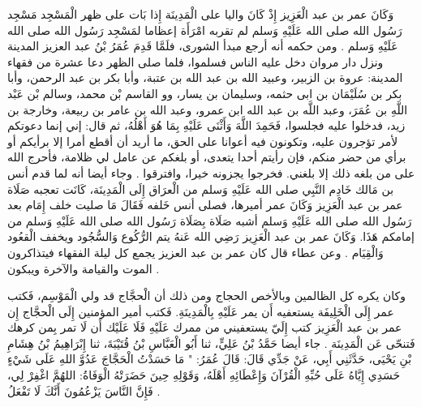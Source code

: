 وَكَانَ عمر بن عبد الْعَزِيز إِذْ كَانَ واليا على الْمَدِينَة إِذا بَات على ظهر الْمَسْجِد مَسْجِد رَسُول الله صلى الله عَلَيْهِ وَسلم لم تقربه امْرَأَة إعظاما لمَسْجِد رَسُول الله صلى الله عَلَيْهِ وَسلم \cite{ibnAbdAlHakam_OmarIbnAbdAlAziz}.
ومن حكمه أنه أرجع مبدأ الشورى، فلَمَّا قَدِمَ عُمَرُ بْنُ عبد العزيز المدينة ونزل دار مروان دخل عليه الناس فسلموا، فلما صلى الظهر دعا عشرة من فقهاء المدينة: عروة بن الزبير، وعبيد الله بن عبد الله بن عتبة، وأبا بكر بن عبد الرحمن، وأبا بكر بن سُلَيْمَان بن ابى حثمه، وسليمان بن يسار، وو القاسم بْن محمد، وسالم بْن عَبْد اللَّهِ بن عُمَرَ، وعبد اللَّه بن عبد الله ابن عمرو، وعبد الله بن عامر بن ربيعة، وخارجة بن زيد، فدخلوا عليه فجلسوا، فَحَمِدَ اللَّهَ وَأَثْنَى عَلَيْهِ بِمَا هُوَ أَهْلُهُ، ثم قال: إني إنما دعوتكم لأمر تؤجرون عليه، وتكونون فيه أعوانا على الحق، ما أريد أن أقطع أمرا إلا برأيكم أو برأي من حضر منكم، فإن رأيتم أحدا يتعدى، أو بلغكم عن عامل لي ظلامة، فأحرج الله على من بلغه ذلك إلا بلغني. فخرجوا يجزونه خيرا، وافترقوا \cite{ibnJareerTabari_Tareekh}. وجاء أيضا أنه لما قدم أنس بن مَالك خَادِم النَّبِي صلى الله عَلَيْهِ وَسلم من الْعرَاق إِلَى الْمَدِينَة، كَانَت تعجبه صَلَاة عمر بن عبد الْعَزِيز وَكَانَ عمر أميرها، فصلى أنس خَلفه فَقَالَ مَا صليت خلف إِمَام بعد رَسُول الله صلى الله عَلَيْهِ وَسلم أشبه صَلَاة بِصَلَاة رَسُول الله صلى الله عَلَيْهِ وَسلم من إمامكم هَذَا. وَكَانَ عمر بن عبد الْعَزِيز رَضِي الله عَنهُ يتم الرُّكُوع وَالسُّجُود ويخفف الْقعُود وَالْقِيَام \cite{ibnJareerTabari_Tareekh}. وعن عطاء قال كان عمر بن عبد العزيز يجمع كل ليلة الفقهاء فيتذاكرون الموت والقيامة والآخرة ويبكون \cite{dahabi_Siyar}.

وكان يكره كل الظالمين وبالأخص الحجاج ومن ذلك أن الْحجَّاج قد ولي الْمَوْسِم، فَكتب عمر إِلَى الْخَلِيفَة يستعفيه أَن يمر عَلَيْهِ بِالْمَدِينَةِ. فَكتب أمير المؤمنين إِلَى الْحجَّاج إِن عمر بن عبد الْعَزِيز كتب إِلَيّ يستعفيني من ممرك عَلَيْهِ فَلَا عَلَيْك أَن لَا تمر بِمن كرهك فَتنحّى عَن الْمَدِينَة  \cite{ibnAbdAlHakam_OmarIbnAbdAlAziz}. جاء أيضا حَمَّدُ بْنُ عَلِيٍّ، ثنا أَبُو الْعَبَّاسِ بْنُ قُتَيْبَةَ، ثنا إِبْرَاهِيمُ بْنُ هِشَامِ بْنِ يَحْيَى، حَدَّثَنِي أَبِي، عَنْ جَدِّي قَالَ: قَالَ عُمَرُ: " مَا حَسَدْتُ الْحَجَّاجَ عَدُوَّ اللهِ عَلَى شَيْءٍ حَسَدِي إِيَّاهُ عَلَى حُبِّهِ الْقُرْآنَ وَإِعْطَائِهِ أَهْلَهُ، وَقَوْلِهِ حِينَ حَضَرَتْهُ الْوَفَاةُ: اللهُمَّ اغْفِرْ لِي، فَإِنَّ النَّاسَ يَزْعُمُونَ أَنَّكَ لَا تَفْعَلُ \cite{abuNuaim_Hilya}.

